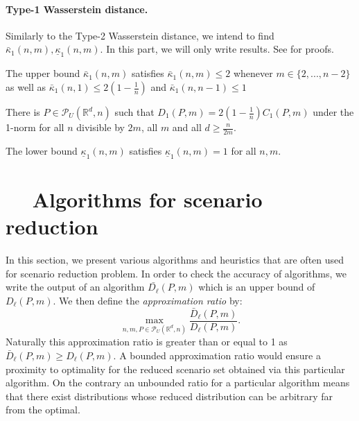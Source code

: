 \documentclass{amsart}
\newcommand{\RR}{\mathbb{R}}
\begin{document}
\paragraph{\textbf{Type-1 Wasserstein distance.}}
Similarly to the Type-2 Wasserstein distance, we intend to find $\bar{\kappa}_1\left(n,m\right), \underline\kappa_1\left(n,m\right)$. In this part, we will only write results. See \cite[Section 3.2]{rujeerapaiboon_scenario_2022} for proofs.
\begin{theorem}
    The upper bound $\bar\kappa_1\left(n,m\right)$ satisfies $\bar\kappa_1\left(n,m\right)\leq2$ whenever $m\in\{2,...,n-2\}$ as well as $\bar\kappa_1\left(n,1\right)\leq2\left(1-\frac{1}{n}\right)$ and $\bar\kappa_1\left(n,n-1\right)\leq1$
\end{theorem}
\begin{proposition}
    There is $P\in\mathcal{P}_U\left(\RR^d,n\right)$ such that $D_1\left(P,m\right)=2\left(1-\frac{1}{n}\right)C_1\left(P,m\right)$ under the 1-norm for all $n$ divisible by $2m$, all $m$ and all $d\geq \frac{n}{2m}$.
\end{proposition}
\begin{proposition}
    The lower bound $\underline{\kappa}_1\left(n,m\right)$ satisfies $\underline{\kappa}_1\left(n,m\right)=1$ for all $n, m$.
\end{proposition}
\section{$\quad$ Algorithms for scenario reduction}
In this section, we present various algorithms and heuristics that are often used for scenario reduction problem. In order to check the accuracy of algorithms, we write the output of an algorithm $\bar{D_\ell}\left(P,m\right)$ which is an upper bound of   $D_\ell\left(P,m\right)$. We then define the \emph{approximation ratio} by: 
$$
\max_{n,m,P\in\mathcal{P}_U(\RR^d,n)}\frac{\bar{D}_\ell\left(P,m\right)}{D_\ell\left(P,m\right)}.
$$
Naturally this approximation ratio is greater than or equal to 1 as $\bar{D}_\ell\left(P,m\right)\geq D_\ell\left(P,m\right)$. A bounded approximation ratio would ensure a proximity to optimality for the reduced scenario set obtained via this particular algorithm. On the contrary an unbounded ratio for a particular algorithm means that there exist distributions whose reduced distribution can be arbitrary far from the optimal.
\end{document}
